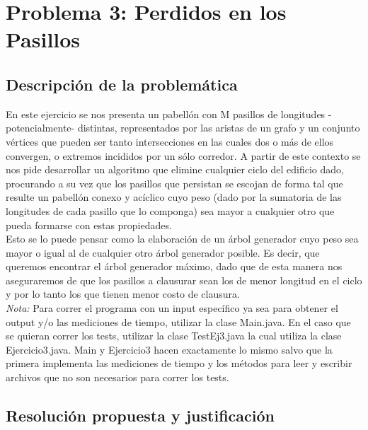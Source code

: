 \newpage
\section{Problema 3: Perdidos en los Pasillos}

\subsection{Descripción de la problemática}

En este ejercicio se nos presenta un pabellón con M pasillos de longitudes -potencialmente- distintas, representados por las aristas de un grafo y un conjunto vértices que pueden ser tanto intersecciones en las cuales dos o más de ellos convergen, o extremos incididos por un sólo corredor. 
A partir de este contexto se nos pide desarrollar un algoritmo que elimine cualquier ciclo del edificio dado, procurando a su vez que los pasillos que persistan se escojan de forma tal que resulte un pabellón conexo y acíclico cuyo peso (dado por la sumatoria de las longitudes de cada pasillo que lo componga) sea mayor a cualquier otro que pueda formarse con estas propiedades.\\
Esto se lo puede pensar como la elaboración de un árbol generador cuyo peso  sea mayor o igual al de cualquier otro árbol generador posible. Es decir, que queremos encontrar el árbol generador máximo, dado que de esta manera nos aseguraremos de que los pasillos a clausurar sean los de menor longitud en el ciclo y por lo tanto los que tienen menor costo de clausura. \label{descTres}\\

\emph{Nota:} Para correr el programa con un input específico ya sea para obtener el output y/o las mediciones de tiempo, utilizar la clase Main.java. En el caso que se quieran correr los tests, utilizar la clase TestEj3.java la cual utiliza la clase Ejercicio3.java. Main y Ejercicio3 hacen exactamente lo mismo salvo que la primera implementa las mediciones de tiempo y los métodos para leer y escribir archivos que no son necesarios para correr los tests. 

\subsection{Resolución propuesta y justificación}

